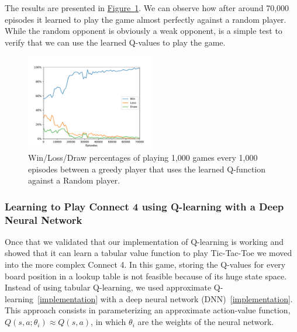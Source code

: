 \documentclass{article}
\newcommand{\GithubURL}[1]{[\href{https://github.com/davidrobles/mlnd-capstone-code/blob/master/#1}{implementation}]}
\begin{document}
The results are presented in \hyperref[fig:tic-ql-tab-full-selfplay-wld-plot]
{Figure~\ref*{fig:tic-ql-tab-full-selfplay-wld-plot}}. We can observe how after around 70,000
episodes it learned to play the game almost perfectly against a random player. While the random
opponent is obviously a weak opponent, is a simple test to verify that we can use the learned
Q-values to play the game.


\begin{figure}[!h]
    \centering
    \includegraphics[width=0.50\textwidth]{figures/tic_ql_tab_full_selfplay_wld_plot.pdf}
    \caption{Win/Loss/Draw percentages of playing 1,000 games every 1,000 episodes
             between a greedy player that uses the learned Q-function against a Random player.}
    \label{fig:tic-ql-tab-full-selfplay-wld-plot}
\end{figure}


\subsubsection{Learning to Play Connect 4 using Q-learning with a Deep Neural Network}

Once that we validated that our implementation of Q-learning is working and showed that it can learn
a tabular value function to play Tic-Tac-Toe we moved into the more complex Connect 4. In this game,
storing the Q-values for every board position in a lookup table is not feasible because of its huge
state space. Instead of using tabular Q-learning, we used approximate
Q-learning~\GithubURL{capstone/rl/learners/qlearning_approx.py} with a deep neural network
(DNN)~\GithubURL{capstone/rl/value_functions/c4deepnetwork.py}. This approach consists in
parameterizing an approximate action-value function, $Q(s,a;\theta_i) \approx Q(s,a)$, in which
$\theta_i$ are the weights of the neural network.
\end{document}
